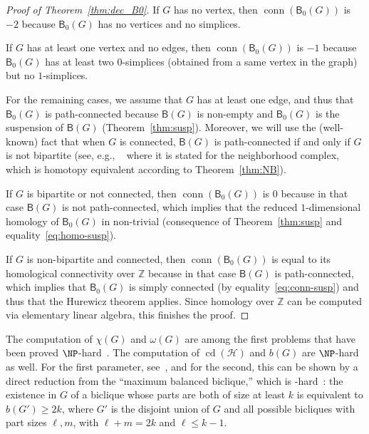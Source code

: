 \documentclass[12pt]{amsart}
\theoremstyle{definition}
\def\Z{\mathbb{Z}}
\def\HH{\mathcal{H}}
\def\B{\mathsf{B}}
\renewcommand{\geq}{\geqslant}
\renewcommand{\leq}{\leqslant}
\def\conn{\operatorname{conn}}
\def\cd{\operatorname{cd}}
\begin{document}
\begin{proof}[Proof of Theorem~\ref{thm:dec_B0}]
If $G$ has no vertex, then $\conn(\B_0(G))$ is $-2$ because $\B_0(G)$ has no vertices and no simplices.

If $G$ has at least one vertex and no edges, then $\conn(\B_0(G))$ is $-1$ because $\B_0(G)$ has at least two $0$-simplices (obtained from a same vertex in the graph) but no $1$-simplices.

For the remaining cases, we assume that $G$ has at least one edge, and thus that $\B_0(G)$ is path-connected because $\B(G)$ is non-empty and $\B_0(G)$ is the suspension of $\B(G)$ (Theorem~\ref{thm:susp}). Moreover, we will use the (well-known) fact that when $G$ is connected, $\B(G)$ is path-connected if and only if $G$ is not bipartite (see, e.g., ~\cite[p.~320]{lovasz1978kneser} where it is stated for the neighborhood complex, which is homotopy equivalent according to Theorem~\ref{thm:NB}).

If $G$ is bipartite or not connected, then $\conn(\B_0(G))$ is $0$ because in that case $\B(G)$ is not path-connected, which implies that the reduced $1$-dimensional homology of $\B_0(G)$ in non-trivial (consequence of Theorem~\ref{thm:susp} and equality~\eqref{eq:homo-susp}).

If $G$ is non-bipartite and connected, then $\conn(\B_0(G))$ is equal to its homological connectivity over $\Z$ because in that case $\B(G)$ is path-connected, which implies that $\B_0(G)$ is simply connected (by equality~\eqref{eq:conn-susp}) and thus that the Hurewicz theorem applies. Since homology over $\Z$ can be computed via elementary linear algebra, this finishes the proof.
\end{proof}

The computation of $\chi(G)$ and $\omega(G)$ are among the first problems that have been proved $\NP$-hard~\cite{karp1972reducibility}. The computation of $\cd(\HH)$ and $b(G)$ are $\NP$-hard as well. For the first parameter, see~\cite{alishahi2017strengthening}, and for the second, this can be shown by a direct reduction from the ``maximum balanced biclique,'' which is \NP-hard~\cite{garey}: the existence in $G$ of a biclique whose parts are both of size at least $k$ is equivalent to $b(G') \geq 2k$, where $G'$ is the disjoint union of $G$ and all possible bicliques with part sizes $\ell,m$, with $\ell+m=2k$ and $\ell\leq k-1$.
\end{document}
